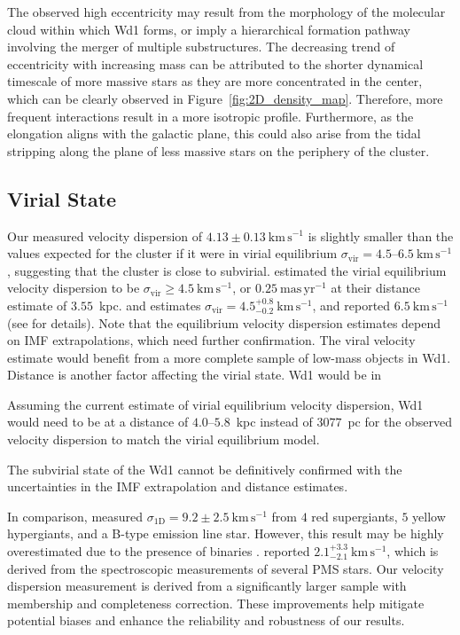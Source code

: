 \documentclass[12pt]{ucsddissertation}
\begin{document}
\begin{CJK*}{UTF8}{gbsn}
The observed high eccentricity may result from the morphology of the molecular cloud within which Wd1 forms, or imply a hierarchical formation pathway involving the merger of multiple substructures. The decreasing trend of eccentricity with increasing mass can be attributed to the shorter dynamical timescale of more massive stars as they are more concentrated in the center, which can be clearly observed in Figure~\ref{fig:2D_density_map}. Therefore, more frequent interactions result in a more isotropic profile. Furthermore, as the elongation aligns with the galactic plane, this could also arise from the tidal stripping along the plane of less massive stars on the periphery of the cluster.



\subsection{Virial State}
\label{wd1-subsec:virial state}
Our measured velocity dispersion of $4.13\pm0.13~\mathrm{km}\,\mathrm{s}^{-1}$ is slightly smaller than the values expected for the cluster if it were in virial equilibrium $\sigma_\mathrm{vir}=4.5$--$6.5~\mathrm{km}\,\mathrm{s}^{-1}$, suggesting that the cluster is close to subvirial. \citet{Brandner-2008} estimated the virial equilibrium velocity dispersion to be $\sigma_\mathrm{vir} \geq 4.5~\mathrm{km}\,\mathrm{s}^{-1}$, or $0.25~\mathrm{mas}\,\mathrm{yr}^{-1}$ at their distance estimate of $3.55$~kpc.  \citet{Gennaro-2011} and \citet{Gennaro-2017} estimates $\sigma_\mathrm{vir}=4.5^{+0.8}_{-0.2}~\mathrm{km}\,\mathrm{s}^{-1}$, and \citet{Negueruela-2010} reported $6.5~\mathrm{km}\,\mathrm{s}^{-1}$ (see \citealp{Cottaar-2012} for details). Note that the equilibrium velocity dispersion estimates depend on IMF extrapolations, which need further confirmation. The viral velocity estimate would benefit from a more complete sample of low-mass objects in Wd1. Distance is another factor affecting the virial state. Wd1 would be in

Assuming the current estimate of virial equilibrium velocity dispersion, Wd1 would need to be at a distance of $4.0$--$5.8$~kpc instead of $3077$~pc for the observed velocity dispersion to match the virial equilibrium model. 

The subvirial state of the Wd1 cannot be definitively confirmed with the uncertainties in the IMF extrapolation and distance estimates.


In comparison, \citet{Mengel-2007} measured $\sigma_\mathrm{1D}=9.2\pm2.5~\mathrm{km}\,\mathrm{s}^{-1}$ from $4$ red supergiants, $5$ yellow hypergiants, and a B-type
emission line star. However, this result may be highly overestimated due to the presence of binaries \citep[e.g.,][]{Kouwenhoven-2008, Gieles-2010}. \citet{Cottaar-2012} reported $2.1^{+3.3}_{-2.1}~\mathrm{km}\,\mathrm{s}^{-1}$, which is derived from the spectroscopic measurements of several PMS stars. Our velocity dispersion measurement is derived from a significantly larger sample with membership and completeness correction. These improvements help mitigate potential biases and enhance the reliability and robustness of our results.



\end{CJK*}
\end{document}

